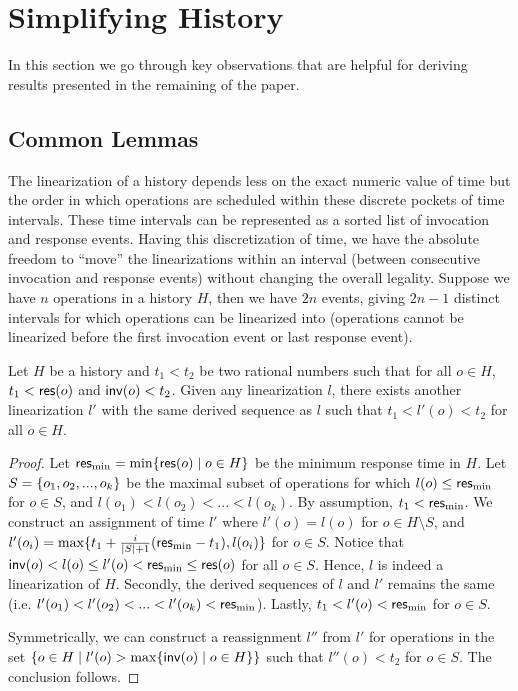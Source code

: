 
\section{Simplifying History}

In this section we go through key observations that are helpful for deriving results presented in the remaining of the paper.

\subsection{Common Lemmas}

The linearization of a history depends less on the exact numeric value of time but the order in which operations are scheduled within these discrete pockets of time intervals. These time intervals can be represented as a sorted list of invocation and response events. Having this discretization of time, we have the absolute freedom to ``move'' the linearizations within an interval (between consecutive invocation and response events) without changing the overall legality. Suppose we have $n$ operations in a history $H$, then we have $2n$ events, giving $2n-1$ distinct intervals for which operations can be linearized into (operations cannot be linearized before the first invocation event or last response event).

\begin{lemma}\label{tight-hist}
    Let $H$ be a history and $t_1 < t_2$ be two rational numbers such that for all $o \in H$, $t_1 < {\sf res}(o)$ and ${\sf inv}(o) < t_2$. Given any linearization $l$, there exists another linearization $l'$ with the same derived sequence as $l$ such that $t_1 < l'(o) < t_2$ for all $o \in H$.
\end{lemma}
\begin{proof}
    Let ${\sf res}_{\min} = \min\{{\sf res}(o) \;|\; o \in H\}$ be the minimum response time in $H$. Let $S = \{o_1, o_2, ..., o_k\}$ be the maximal subset of operations for which $l(o) \leq {\sf res}_{\min}$ for $o \in S$, and $l(o_1) < l(o_2) < ... < l(o_k)$. By assumption, $t_1 < {\sf res}_{\min}$. We construct an assignment of time $l'$ where $l'(o) = l(o)$ for $o \in H \setminus S$, and $l'(o_i) = \max\{t_1 + \frac{i}{|S|+1}({\sf res}_{\min} - t_1),l(o_i)\}$ for $o \in S$. Notice that ${\sf inv}(o) < l(o) \leq l'(o) < {\sf res}_{\min} \leq {\sf res}(o)$ for all $o \in S$. Hence, $l$ is indeed a linearization of $H$. Secondly, the derived sequences of $l$ and $l'$ remains the same (i.e. $l'(o_1) < l'(o_2) < ... < l'(o_k) < {\sf res}_{\min}$). Lastly, $t_1 < l'(o)< {\sf res}_{\min}$ for $o \in S$.

    Symmetrically, we can construct a reassignment $l''$ from $l'$ for operations in the set $\{o\in H \;|\; l'(o) > \max\{{\sf inv}(o) \;|\; o \in H\}\}$ such that $l''(o) < t_2$ for $o \in S$. The conclusion follows.
\end{proof}


